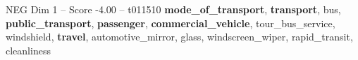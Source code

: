 \begin{textsample}{NEG Dim 1 – Score -4.00 – t011510}  \label{ex:f1_neg_014}
\textbf{mode\_of\_transport}, \textbf{transport}, bus, \textbf{public\_transport}, \textbf{passenger}, \textbf{commercial\_vehicle}, tour\_bus\_service, windshield, \textbf{travel}, automotive\_mirror, glass, windscreen\_wiper, rapid\_transit, cleanliness

\end{textsample}
